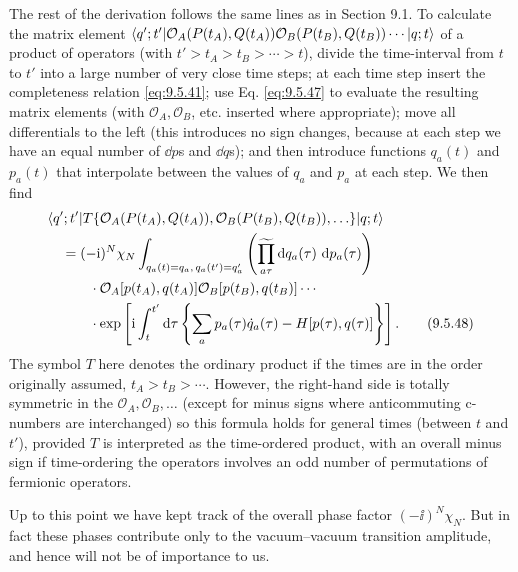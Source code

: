 The rest of the derivation follows the same lines as in Section 9.1. To
calculate the matrix element
$\langle q';t'\rvert\mathcal{O}_A(P(t_A),Q(t_A))
\mathcal{O}_B(P(t_B),Q(t_B))\cdots\lvert q;t\rangle$ of a product of operators (with
$t'>t_A>t_B>\cdots>t$), divide the time-interval from $t$ to $t'$ into a large
number of very close time steps; at each time step insert the completeness
relation \eqref{eq:9.5.41}; use Eq. \eqref{eq:9.5.47} to evaluate the resulting matrix elements
(with $\mathcal{O}_A,\mathcal{O}_B$, etc. inserted where appropriate); move all
differentials to the left (this introduces no sign changes, because at each
step we have an equal number of $\dd p$s and $\dd q$s); and then introduce functions
$q_a(t)$ and $p_a(t)$ that interpolate between the values of $q_a$ and $p_a$ at
each step. We then find
\begin{align}
&\langle q';t'\rvert T\{\mathcal{O}_A(P(t_A),Q(t_A)),
 \mathcal{O}_B(P(t_B),Q(t_B)),\ldots\}\lvert q;t\rangle
\notag\\
&\quad=(-\mathrm{i})^N\chi_N
 \int_{q_a(t)=q_a,\,q_a(t')=q'_a}
 \left(\widetilde{\prod_{a\tau}}\mathop{}\!\mathrm{d} q_a(\tau)\,\mathop{}\!\mathrm{d} p_a(\tau)\right)
 \notag\\
&\qquad\quad\cdot
 \mathcal{O}_A[p(t_A),q(t_A)]
 \mathcal{O}_B[p(t_B),q(t_B)]\cdots
 \notag\\
&\qquad\quad\cdot
 \exp\left[\mathrm{i}\int_t^{t'}\mathop{}\!\mathrm{d}\tau
 \left\{\sum_ap_a(\tau)\dot q_a(\tau)
 -H[p(\tau),q(\tau)]\right\}\right].
\tag{9.5.48}\label{eq:9.5.48}
\end{align}
The symbol $T$ here denotes the ordinary product if the times are in the order
originally assumed, $t_A>t_B>\cdots$. However, the right-hand side is totally
symmetric in the $\mathcal{O}_A,\mathcal{O}_B,\ldots$ (except for minus signs
where anticommuting c-numbers are interchanged) so this formula holds for
general times (between $t$ and $t'$), provided $T$ is interpreted as the
time-ordered product, with an overall minus sign if time-ordering the operators
involves an odd number of permutations of fermionic operators.

Up to this point we have kept track of the overall phase factor
$(-\ii)^N\chi_N$. But in fact these phases contribute only to the vacuum--vacuum
transition amplitude, and hence will not be of importance to us.

